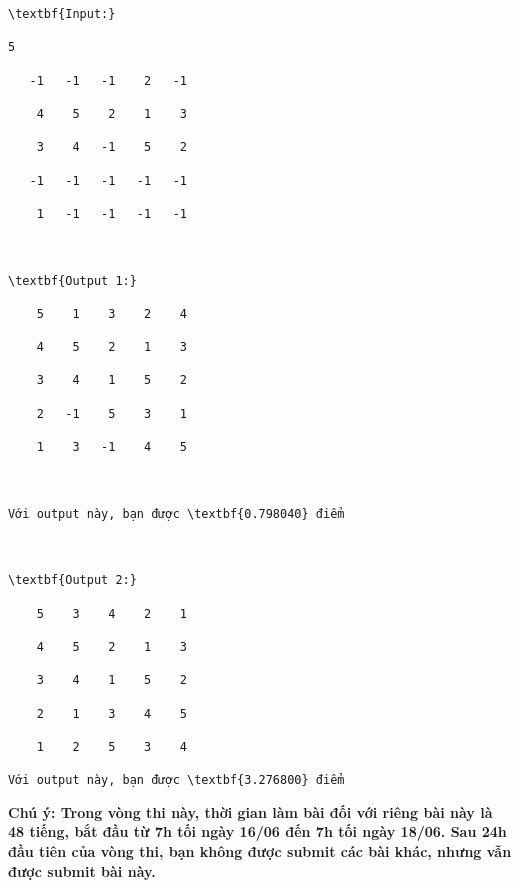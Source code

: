 \begin{verbatim}
\textbf{Input:}

5

   -1   -1   -1    2   -1

    4    5    2    1    3

    3    4   -1    5    2

   -1   -1   -1   -1   -1

    1   -1   -1   -1   -1



\textbf{Output 1:}

    5    1    3    2    4

    4    5    2    1    3

    3    4    1    5    2

    2   -1    5    3    1

    1    3   -1    4    5



Với output này, bạn được \textbf{0.798040} điểm



\textbf{Output 2:}

    5    3    4    2    1

    4    5    2    1    3

    3    4    1    5    2

    2    1    3    4    5

    1    2    5    3    4

Với output này, bạn được \textbf{3.276800} điểm

\end{verbatim}

\textbf{Chú ý: Trong vòng thi này, thời gian làm bài đối với riêng bài này là \textbf{48 tiếng}, bắt đầu từ 7h tối ngày 16/06 đến 7h tối ngày 18/06. Sau 24h đầu tiên của vòng thi, bạn không được submit các bài khác, nhưng vẫn được submit bài này. }